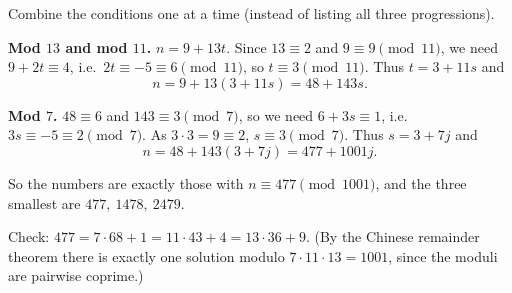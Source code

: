 Combine the conditions one at a time (instead of listing all three progressions).

\textbf{Mod $13$ and mod $11$.} $n=9+13t$. Since $13\equiv2$ and $9\equiv9\pmod{11}$, we need $9+2t\equiv4$, i.e.\ $2t\equiv-5\equiv6\pmod{11}$, so $t\equiv3\pmod{11}$. Thus $t=3+11s$ and
\[
n=9+13(3+11s)=48+143s .
\]

\textbf{Mod $7$.} $48\equiv6$ and $143\equiv3\pmod7$, so we need $6+3s\equiv1$, i.e.\ $3s\equiv-5\equiv2\pmod7$. As $3\cdot3=9\equiv2$, $s\equiv3\pmod7$. Thus $s=3+7j$ and
\[
n=48+143(3+7j)=477+1001j .
\]

So the numbers are exactly those with $\boxed{n\equiv477\pmod{1001}}$, and the three smallest are $\boxed{477,\ 1478,\ 2479}$.

Check: $477=7\cdot68+1=11\cdot43+4=13\cdot36+9$. (By the Chinese remainder theorem there is exactly one solution modulo $7\cdot11\cdot13=1001$, since the moduli are pairwise coprime.)
